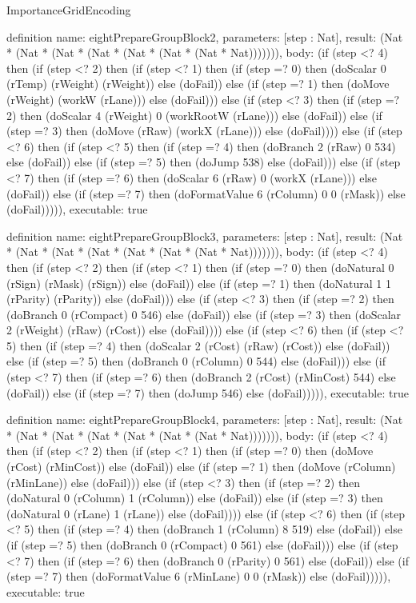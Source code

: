 \begin{lexlean}{ImportanceGridEncoding}
\begin{semanticmodule}
definition{
  name: eightPrepareGroupBlock2,
  parameters: [step : Nat],
  result: (Nat * (Nat * (Nat * (Nat * (Nat * (Nat * (Nat * Nat))))))),
  body: (if (step <? 4) then
      (if (step <? 2) then
      (if (step <? 1) then
      (if (step =? 0) then (doScalar 0 (rTemp) (rWeight) (rWeight)) else (doFail)) else
      (if (step =? 1) then (doMove (rWeight) (workW (rLane))) else (doFail))) else
      (if (step <? 3) then
      (if (step =? 2) then (doScalar 4 (rWeight) 0 (workRootW (rLane))) else (doFail)) else
      (if (step =? 3) then (doMove (rRaw) (workX (rLane))) else (doFail)))) else
      (if (step <? 6) then
      (if (step <? 5) then
      (if (step =? 4) then (doBranch 2 (rRaw) 0 534) else (doFail)) else
      (if (step =? 5) then (doJump 538) else (doFail))) else
      (if (step <? 7) then
      (if (step =? 6) then (doScalar 6 (rRaw) 0 (workX (rLane))) else (doFail)) else
      (if (step =? 7) then (doFormatValue 6 (rColumn) 0 0 (rMask)) else (doFail))))),
  executable: true
}

definition{
  name: eightPrepareGroupBlock3,
  parameters: [step : Nat],
  result: (Nat * (Nat * (Nat * (Nat * (Nat * (Nat * (Nat * Nat))))))),
  body: (if (step <? 4) then
      (if (step <? 2) then
      (if (step <? 1) then
      (if (step =? 0) then (doNatural 0 (rSign) (rMask) (rSign)) else (doFail)) else
      (if (step =? 1) then (doNatural 1 1 (rParity) (rParity)) else (doFail))) else
      (if (step <? 3) then
      (if (step =? 2) then (doBranch 0 (rCompact) 0 546) else (doFail)) else
      (if (step =? 3) then (doScalar 2 (rWeight) (rRaw) (rCost)) else (doFail)))) else
      (if (step <? 6) then
      (if (step <? 5) then
      (if (step =? 4) then (doScalar 2 (rCost) (rRaw) (rCost)) else (doFail)) else
      (if (step =? 5) then (doBranch 0 (rColumn) 0 544) else (doFail))) else
      (if (step <? 7) then
      (if (step =? 6) then (doBranch 2 (rCost) (rMinCost) 544) else (doFail)) else
      (if (step =? 7) then (doJump 546) else (doFail))))),
  executable: true
}

definition{
  name: eightPrepareGroupBlock4,
  parameters: [step : Nat],
  result: (Nat * (Nat * (Nat * (Nat * (Nat * (Nat * (Nat * Nat))))))),
  body: (if (step <? 4) then
      (if (step <? 2) then
      (if (step <? 1) then
      (if (step =? 0) then (doMove (rCost) (rMinCost)) else (doFail)) else
      (if (step =? 1) then (doMove (rColumn) (rMinLane)) else (doFail))) else
      (if (step <? 3) then
      (if (step =? 2) then (doNatural 0 (rColumn) 1 (rColumn)) else (doFail)) else
      (if (step =? 3) then (doNatural 0 (rLane) 1 (rLane)) else (doFail)))) else
      (if (step <? 6) then
      (if (step <? 5) then
      (if (step =? 4) then (doBranch 1 (rColumn) 8 519) else (doFail)) else
      (if (step =? 5) then (doBranch 0 (rCompact) 0 561) else (doFail))) else
      (if (step <? 7) then
      (if (step =? 6) then (doBranch 0 (rParity) 0 561) else (doFail)) else
      (if (step =? 7) then (doFormatValue 6 (rMinLane) 0 0 (rMask)) else (doFail))))),
  executable: true
}


\end{semanticmodule}
\end{lexlean}
